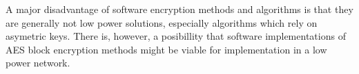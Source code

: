 A major disadvantage of software encryption methods and algorithms is that they are generally not low 
power solutions, especially algorithms which rely on asymetric keys. There is, however, a posibillity 
that software implementations of AES block encryption methods might be viable for implementation in 
a low power network.
